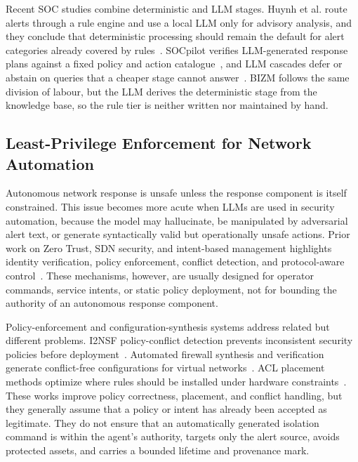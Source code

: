 \documentclass[final,5p]{elsarticle}
\begin{document}
Recent SOC studies combine deterministic and LLM stages. Huynh et al. route alerts through a rule engine and use a local LLM only for advisory analysis, and they conclude that deterministic processing should remain the default for alert categories already covered by rules~\cite{huynh2026controlled}. SOCpilot verifies LLM-generated response plans against a fixed policy and action catalogue~\cite{barbieri2026socpilot}, and LLM cascades defer or abstain on queries that a cheaper stage cannot answer~\cite{zellinger2025cascades}. BIZM follows the same division of labour, but the LLM derives the deterministic stage from the knowledge base, so the rule tier is neither written nor maintained by hand.

\subsection{Least-Privilege Enforcement for Network Automation}
\label{sec:rw_enforcement}

Autonomous network response is unsafe unless the response component is itself constrained. This issue becomes more acute when LLMs are used in security automation, because the model may hallucinate, be manipulated by adversarial alert text, or generate syntactically valid but operationally unsafe actions. Prior work on Zero Trust, SDN security, and intent-based management highlights identity verification, policy enforcement, conflict detection, and protocol-aware control~\cite{rose2020zerotrust,metzger2023intentsecurity}. These mechanisms, however, are usually designed for operator commands, service intents, or static policy deployment, not for bounding the authority of an autonomous response component.

Policy-enforcement and configuration-synthesis systems address related but different problems. I2NSF policy-conflict detection prevents inconsistent security policies before deployment~\cite{nguyen2023i2nsf}. Automated firewall synthesis and verification generate conflict-free configurations for virtual networks~\cite{bringhenti2022firewall}. ACL placement methods optimize where rules should be installed under hardware constraints~\cite{zahwa2025acl}. These works improve policy correctness, placement, and conflict handling, but they generally assume that a policy or intent has already been accepted as legitimate. They do not ensure that an automatically generated isolation command is within the agent's authority, targets only the alert source, avoids protected assets, and carries a bounded lifetime and provenance mark.
\end{document}
